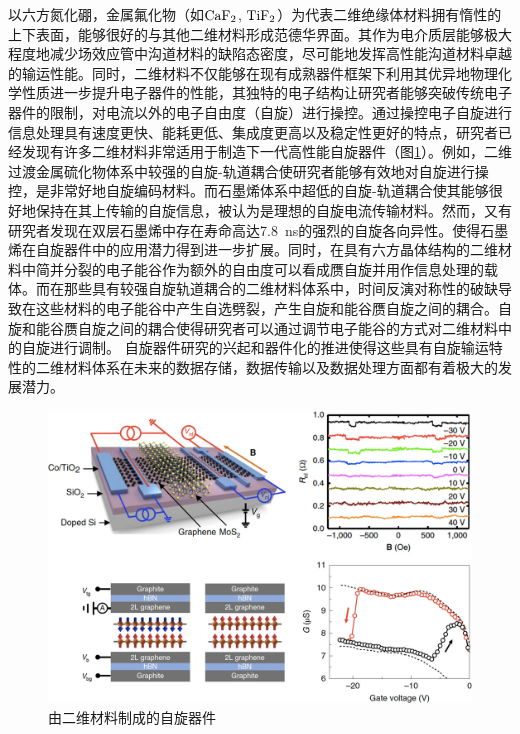     以六方氮化硼，金属氟化物（如$\rm{CaF_{2}}$, $\rm{TiF_{2}}$）为代表二维绝缘体材料拥有惰性的上下表面，能够很好的与其他二维材料形成范德华界面。其作为电介质层能够极大程度地减少场效应管中沟道材料的缺陷态密度，尽可能地发挥高性能沟道材料卓越的输运性能。同时，二维材料不仅能够在现有成熟器件框架下利用其优异地物理化学性质进一步提升电子器件的性能，其独特的电子结构让研究者能够突破传统电子器件的限制，对电流以外的电子自由度（自旋）进行操控。通过操控电子自旋进行信息处理具有速度更快、能耗更低、集成度更高以及稳定性更好的特点，研究者已经发现有许多二维材料非常适用于制造下一代高性能自旋器件（图\ref{fig:intro_2DM-spintronic}）。例如，二维过渡金属硫化物体系中较强的自旋-轨道耦合使研究者能够有效地对自旋进行操控，是非常好地自旋编码材料。而石墨烯体系中超低的自旋-轨道耦合使其能够很好地保持在其上传输的自旋信息，被认为是理想的自旋电流传输材料。然而，又有研究者发现在双层石墨烯中存在寿命高达\SI{7.8}{\nano\second}的强烈的自旋各向异性。使得石墨烯在自旋器件中的应用潜力得到进一步扩展。同时，在具有六方晶体结构的二维材料中简并分裂的电子能谷作为额外的自由度可以看成赝自旋并用作信息处理的载体。而在那些具有较强自旋轨道耦合的二维材料体系中，时间反演对称性的破缺导致在这些材料的电子能谷中产生自选劈裂，产生自旋和能谷赝自旋之间的耦合。自旋和能谷赝自旋之间的耦合使得研究者可以通过调节电子能谷的方式对二维材料中的自旋进行调制。
    自旋器件研究的兴起和器件化的推进使得这些具有自旋输运特性的二维材料体系在未来的数据存储，数据传输以及数据处理方面都有着极大的发展潜力。

    \begin{figure}[htb]
        \includegraphics{pic/INTRO_SPIN.png}
        \caption{由二维材料制成的自旋器件}
        \label{fig:intro_2DM-spintronic}
    \end{figure}



